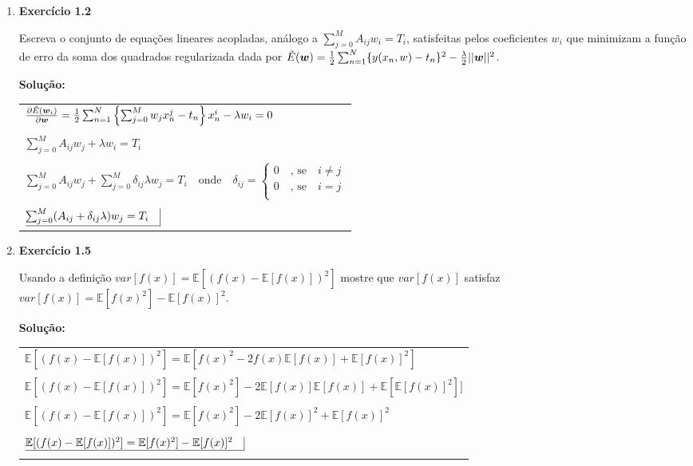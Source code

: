 \begin{enumerate}
\item \textbf{Exercício 1.2} \par

Escreva o conjunto de equações lineares acopladas, análogo a $\sum_{j=0}^{M}A_{ij} w_i = T_i$, satisfeitas pelos coeficientes $w_i$ que minimizam a função de erro da soma dos quadrados regularizada dada por $\Tilde{E}(\boldsymbol{w})=\frac{1}{2}\sum_{n=1}^{N} \{y(x_n,w)-t_n\}^2 - \frac{\lambda}{2}||\boldsymbol{w}||^2$.
\newline \par
\textbf{Solução:}

\begin{tabular}{l}
\\
$ \frac{\partial \Tilde{E}(\boldsymbol{w}_i)}{\partial \boldsymbol{w}}=\frac{1}{2}\sum_{n=1}^{N} \left\{ \sum_{j=0}^{M} w_j x_n^j -t_n 
\right\} x_n^i    - \lambda w_i = 0$\\
\\
$  \sum_{j=0}^{M}A_{ij} w_j + \lambda w_i = T_i $\\
\\
$  \sum_{j=0}^{M}A_{ij} w_j + \sum_{j=0}^{M} \delta_{ij} \lambda w_j = T_i \quad \text{onde} \quad  \delta_{ij} = \begin{cases}
0 \quad \text{, se} \quad i \neq j\\
0 \quad \text{, se} \quad i = j\\
\end{cases}$\\
\\
$\underline{\sum_{j=0}^{M}(A_{ij} + \delta_{ij} \lambda)w_j = T_i\quad} \vline $
\end{tabular}

\item \textbf{Exercício 1.5} \par

Usando a definição $var[f(x)]=\mathbb{E}[(f(x)-\mathbb{E}[f(x)])^2]$ mostre que $var[f(x)]$ satisfaz $var[f(x)]=\mathbb{E}[f(x)^2]-\mathbb{E}[f(x)]^2$.
\newline \par
\textbf{Solução:}

\begin{tabular}{l}
\\
$\mathbb{E}[(f(x)-\mathbb{E}[f(x)])^2] = \mathbb{E}[f(x)^2-2f(x)\mathbb{E}[f(x)]+\mathbb{E}[f(x)]^2]$\\
\\
$\mathbb{E}[(f(x)-\mathbb{E}[f(x)])^2] = \mathbb{E}[f(x)^2]-2\mathbb{E}[f(x)]\mathbb{E}[f(x)]+\mathbb{E}[\mathbb{E}[f(x)]^2]]$\\
\\
$\mathbb{E}[(f(x)-\mathbb{E}[f(x)])^2] = \mathbb{E}[f(x)^2]-2\mathbb{E}[f(x)]^2+\mathbb{E}[f(x)]^2$\\
\\
$\underline{\mathbb{E}[(f(x)-\mathbb{E}[f(x)])^2] = \mathbb{E}[f(x)^2]-\mathbb{E}[f(x)]^2\quad} \vline$\\
\\
\end{tabular}




\end{enumerate}

